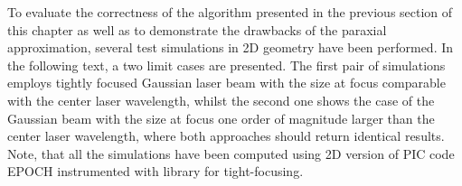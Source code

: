 To evaluate the correctness of the algorithm presented in the previous section of this chapter as well as to demonstrate the drawbacks of the paraxial approximation, several test simulations in 2D geometry have been performed. In the following text, a two limit cases are presented. The first pair of simulations employs tightly focused Gaussian laser beam with the size at focus comparable with the center laser wavelength, whilst the second one shows the case of the Gaussian beam with the size at focus one order of magnitude larger than the center laser wavelength, where both approaches should return identical results. Note, that all the simulations have been computed using 2D version of PIC code EPOCH \cite{bennett} instrumented with library for tight-focusing.

